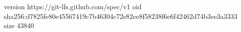 version https://git-lfs.github.com/spec/v1
oid sha256:d7825fe80e45567419c7b46304c72e82ee8f58238f6e6f42462d74b3ee3a3333
size 43840
